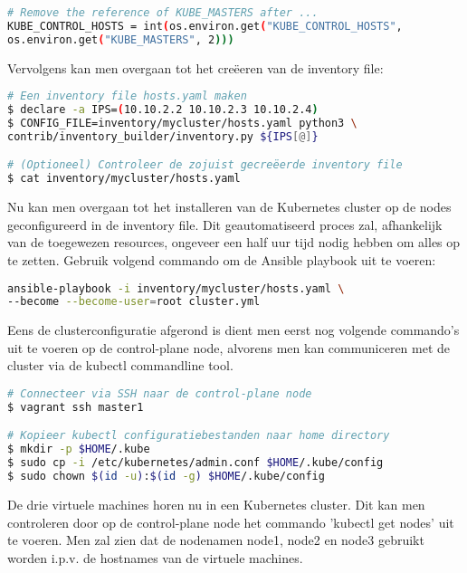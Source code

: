 \begin{lstlisting}[language=bash]
# Remove the reference of KUBE_MASTERS after ...
KUBE_CONTROL_HOSTS = int(os.environ.get("KUBE_CONTROL_HOSTS",
os.environ.get("KUBE_MASTERS", 2)))

\end{lstlisting}  

Vervolgens kan men overgaan tot het creëeren van de inventory file: 

\begin{lstlisting}[language=bash]
# Een inventory file hosts.yaml maken
$ declare -a IPS=(10.10.2.2 10.10.2.3 10.10.2.4)
$ CONFIG_FILE=inventory/mycluster/hosts.yaml python3 \
contrib/inventory_builder/inventory.py ${IPS[@]}    

# (Optioneel) Controleer de zojuist gecreëerde inventory file
$ cat inventory/mycluster/hosts.yaml

\end{lstlisting}

Nu kan men overgaan tot het installeren van de Kubernetes cluster op de nodes geconfigureerd in de inventory file. Dit geautomatiseerd proces zal, afhankelijk van de toegewezen resources, ongeveer een half uur tijd nodig hebben om alles op te zetten. Gebruik volgend commando om de Ansible playbook uit te voeren: 

\begin{lstlisting}[language=bash]
ansible-playbook -i inventory/mycluster/hosts.yaml \
--become --become-user=root cluster.yml

\end{lstlisting}

Eens de clusterconfiguratie afgerond is dient men eerst nog volgende commando's uit te voeren op de control-plane node, alvorens men kan communiceren met de cluster via de kubectl commandline tool. 
\begin{lstlisting}[language=bash] 
# Connecteer via SSH naar de control-plane node    
$ vagrant ssh master1

# Kopieer kubectl configuratiebestanden naar home directory
$ mkdir -p $HOME/.kube
$ sudo cp -i /etc/kubernetes/admin.conf $HOME/.kube/config
$ sudo chown $(id -u):$(id -g) $HOME/.kube/config

\end{lstlisting}

De drie virtuele machines horen nu in een Kubernetes cluster. Dit kan men controleren door op de control-plane node het commando 'kubectl get nodes' uit te voeren. 
Men zal zien dat de nodenamen node1, node2 en node3 gebruikt worden i.p.v. de hostnames van de virtuele machines.

